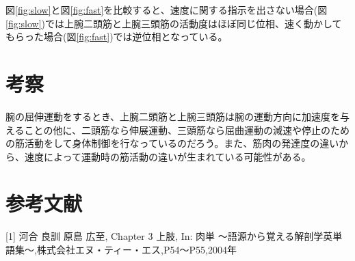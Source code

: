\documentclass{jsarticle}
\begin{document}
図\ref{fig:slow}と図\ref{fig:fast}を比較すると、速度に関する指示を出さない場合(図\ref{fig:slow})では上腕二頭筋と上腕三頭筋の活動度はほぼ同じ位相、速く動かしてもらった場合(図\ref{fig:fast})では逆位相となっている。

\section{考察}
腕の屈伸運動をするとき、上腕二頭筋と上腕三頭筋は腕の運動方向に加速度を与えることの他に、二頭筋なら伸展運動、三頭筋なら屈曲運動の減速や停止のための筋活動をして身体制御を行なっているのだろう。また、筋肉の発達度の違いから、速度によって運動時の筋活動の違いが生まれている可能性がある。

\section*{参考文献}
[1] 河合 良訓 原島 広至, Chapter 3 上肢, In: 肉単 〜語源から覚える解剖学英単語集〜,株式会社エヌ・ティー・エス,P54〜P55,2004年
\end{document}
